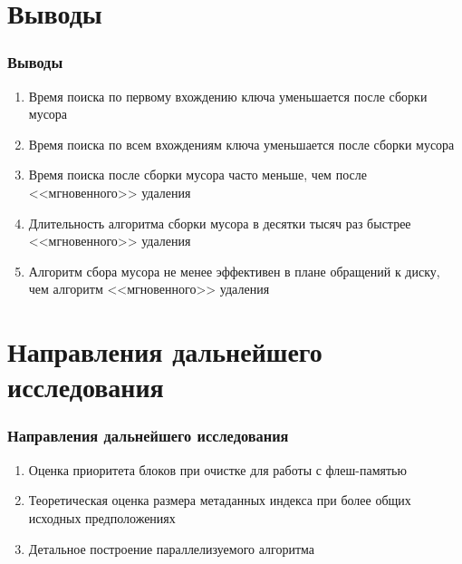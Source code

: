 \documentclass[aspectratio=169, pdf, 8pt, unicode]{beamer}
\begin{document}
\section{Выводы}

\begin{frame}[fragile]
\frametitle{Выводы}
\begin{enumerate}
\item Время поиска по первому вхождению ключа уменьшается после сборки мусора
\item Время поиска по всем вхождениям ключа уменьшается после сборки мусора
\item Время поиска после сборки мусора часто меньше, чем после <<мгновенного>>
удаления
\item Длительность алгоритма сборки мусора в десятки тысяч раз быстрее <<мгновенного>> удаления
\item Алгоритм сбора мусора не менее эффективен в плане обращений к диску, чем алгоритм <<мгновенного>> удаления
\end{enumerate}
\end{frame}

\section{Направления дальнейшего исследования}

\begin{frame}[fragile]
\frametitle{Направления дальнейшего исследования}
\begin{enumerate}
\item Оценка приоритета блоков при очистке для работы с флеш-памятью
\item Теоретическая оценка размера метаданных индекса при более общих
исходных предположениях
\item Детальное построение параллелизуемого алгоритма
\end{enumerate}
\end{frame}
\end{document}
